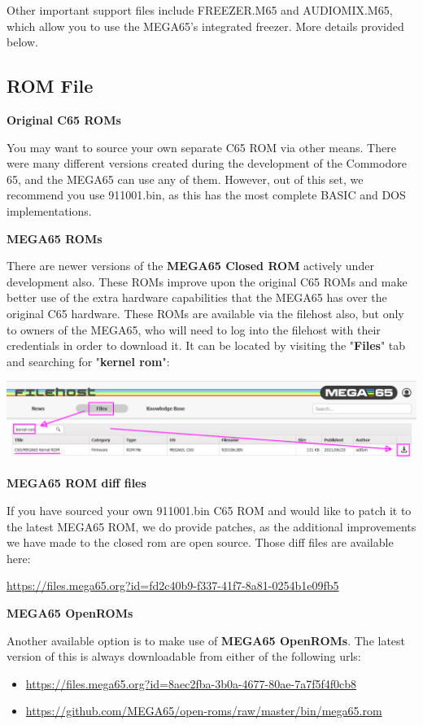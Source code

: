Other important support files include FREEZER.M65 and AUDIOMIX.M65, which
allow you to use the MEGA65's integrated freezer. More details provided below. 

\subsection{ROM File}

\textbf{Original C65 ROMs}

You may want to source your own separate C65 ROM via other means.  There were many different versions created during the development of the Commodore 65,
and the MEGA65 can use any of them.  However, out of this set, we recommend you use 911001.bin, as this has the most complete BASIC and DOS implementations.

\textbf{MEGA65 ROMs}

There are newer versions of the \textbf{MEGA65 Closed ROM} actively under development also. These ROMs improve upon the original C65 ROMs and make better use of the extra hardware capabilities that the MEGA65 has over the original C65 hardware. These ROMs are available via the filehost also, but only to owners of the MEGA65, who will need to log into the filehost with their credentials in order to download it. It can be located by visiting the "\textbf{Files}" tab and searching for "\textbf{kernel rom}":

\includegraphics[width=\linewidth]{images/latest_closed_rom.png}

\textbf{MEGA65 ROM diff files}

If you have sourced your own 911001.bin C65 ROM and would like to patch it to the latest MEGA65 ROM, we do provide patches, as the additional improvements we have made to the closed rom are open source. Those diff files are available here:

\url{https://files.mega65.org?id=fd2c40b9-f337-41f7-8a81-0254b1e09fb5}

\textbf{MEGA65 OpenROMs}

Another available option is to make use of \textbf{MEGA65 OpenROMs}. The latest version of this is always downloadable from either of the following urls:

\begin{itemize}
  \item \url{https://files.mega65.org?id=8aec2fba-3b0a-4677-80ae-7a7f5f4f0cb8}
  \item \url{https://github.com/MEGA65/open-roms/raw/master/bin/mega65.rom}
\end{itemize}


